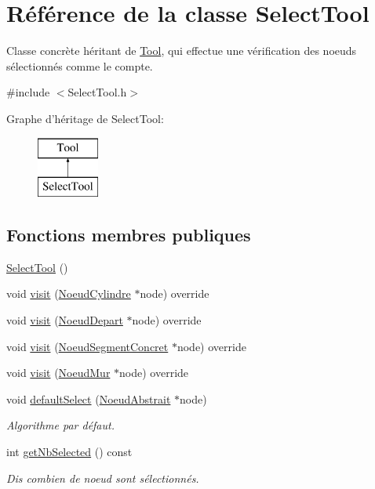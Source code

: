 \hypertarget{class_select_tool}{\section{Référence de la classe Select\-Tool}
\label{class_select_tool}
}


Classe concrète héritant de \hyperlink{class_tool}{Tool}, qui effectue une vérification des noeuds sélectionnés comme le compte.  




{\ttfamily \#include $<$Select\-Tool.\-h$>$}

Graphe d'héritage de Select\-Tool\-:\begin{figure}[H]
\begin{center}
\leavevmode
\includegraphics[height=2.000000cm]{class_select_tool}
\end{center}
\end{figure}
\subsection*{Fonctions membres publiques}
\begin{DoxyCompactItemize}
\item 
\hyperlink{group__inf2990_ga2174af55e744036f0ccc5ce1fe25ddb1}{Select\-Tool} ()
\item 
void \hyperlink{group__inf2990_gacd9fee116b738725ab0f664029253fa0}{visit} (\hyperlink{class_noeud_cylindre}{Noeud\-Cylindre} $\ast$node) override
\item 
void \hyperlink{group__inf2990_ga392f7eb2a74106cff675878f5453a9d3}{visit} (\hyperlink{class_noeud_depart}{Noeud\-Depart} $\ast$node) override
\item 
void \hyperlink{group__inf2990_ga3e4db43bef245d0d88d49f018fee424f}{visit} (\hyperlink{class_noeud_segment_concret}{Noeud\-Segment\-Concret} $\ast$node) override
\item 
void \hyperlink{group__inf2990_gab6a7d46d8fad7c1045678b6dec3c9400}{visit} (\hyperlink{class_noeud_mur}{Noeud\-Mur} $\ast$node) override
\item 
void \hyperlink{group__inf2990_ga01b8ec1322baa74ee48e5087337bc959}{default\-Select} (\hyperlink{class_noeud_abstrait}{Noeud\-Abstrait} $\ast$node)
\begin{DoxyCompactList}\small\item\em Algorithme par défaut. \end{DoxyCompactList}\item 
int \hyperlink{group__inf2990_gaca4f60cc972b5d9df612f48c18c8364a}{get\-Nb\-Selected} () const 
\begin{DoxyCompactList}\small\item\em Dis combien de noeud sont sélectionnés. \end{DoxyCompactList}\end{DoxyCompactItemize}


